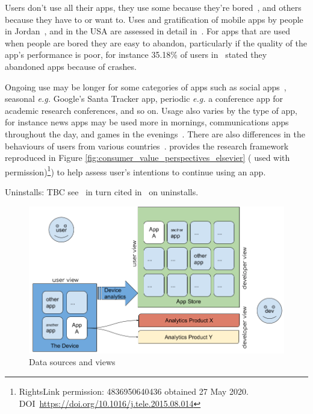 Users don't use all their apps, they use some because they're bored~\cite{pielot2015attention}, and others because they have to or want to. Uses and gratification of mobile apps by people in Jordan~\cite{ALNAWAS2016313}, and in the USA are assessed in detail in~\cite{gerlich2015app}. For apps that are used when people are bored they are easy to abandon, particularly if the quality of the app's performance is poor, for instance 35.18\% of users in~\cite{lim_investigating_country_differences} stated they abandoned apps because of crashes. 

Ongoing use may be longer for some categories of apps such as social apps~\cite{HSIAO2016342}, seasonal \emph{e.g.} Google's Santa Tracker app, periodic \emph{e.g.} a conference app for academic research conferences, and so on. Usage also varies by the type of app, for instance news apps may be used more in mornings, communications apps throughout the day, and games in the evenings~\cite{bohmer2011falling_asleep_with_angry_birds}. There are also differences in the behaviours of users from various countries~\cite{lim_investigating_country_differences}.  
\cite{HSIAO2016342} provides the research framework reproduced in Figure \ref{fig:consumer_value_perspectives_elsevier} ( used with permission)\footnote{RightsLink permission: 4836950640436 obtained 27 May 2020. DOI~\url{https://doi.org/10.1016/j.tele.2015.08.014}}) to help assess user's intentions to continue using an app.

Uninstalls: TBC see~\cite{bohmer2011falling_asleep_with_angry_birds} in turn cited in~\cite{lim_investigating_country_differences} on uninstalls. %

\begin{figure}[htbp!]
    \centering
    \includegraphics[width=\textwidth]{images/data_sources_and_views_25_jan_2020.jpg}
    \caption{Data sources and views}
    \label{fig:data_sources_and_views}
\end{figure}

